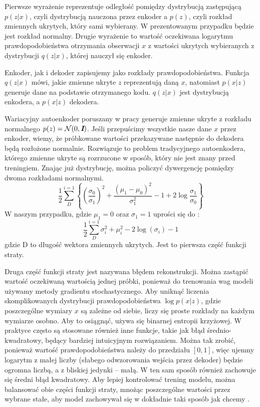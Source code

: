 \documentclass[a4paper,12pt,oneside]{book} %
\begin{document}
Pierwsze wyrażenie reprezentuje odległość pomiędzy dystrybucją zastępującą $p(z|x)$, czyli dystrybucją nauczona przez enkoder a $p(z)$, czyli rozkład zmiennych ukrytych, który sami wybierany. W prezentowanym przypadku będzie jest rozkład normalny. Drugie wyrażenie to wartość oczekiwana logarytmu prawdopodobieństwa otrzymania obserwacji $x$ z wartości ukrytych wybieranych z dystrybucji $q(z|x)$, której nauczył się enkoder.

Enkoder, jak i dekoder zapisujemy jako rozkłady prawdopodobieństwa. Funkcja $q(z|x)$ mówi, jakie zmienne ukryte $z$ reprezentują daną $x$, natomiast $p(x|z)$ generuje dane na podstawie otrzymanego kodu. $q(z|x)$ jest dystrybucją enkodera, a $p(x|z)$ dekodera.

Wariacyjny autoenkoder poruszany w pracy generuje zmienne ukryte z rozkładu normalnego $p(z)=\mathcal{N}(0,\textit{\textbf{I}})$. Jeśli przepuścimy wszystkie nasze dane $x$ przez enkoder, wiemy, że próbkowane wartości przekazywane następnie do dekodera będą rozłożone normalnie. Rozwiązuje to problem tradycyjnego autoenkodera, którego zmienne ukryte są rozrzucone w sposób, który nie jest znany przed treningiem. Znając już dystrybucję, można policzyć dywergencję pomiędzy dwoma rozkładami normalnymi.
\begin{equation}
	\dfrac{1}{2}\displaystyle\sum_{D}^{i=1}\left\{\left(\dfrac{\sigma_0}{\sigma_1}\right)^2+\dfrac{(\mu_1 - \mu_0)^2}{\sigma_1^2} - 1 + 2\log\dfrac{\sigma_1}{\sigma_0}\right\}
	\label{equ:kldnormals}
\end{equation}
W naszym przypadku, gdzie $\mu_1 = 0$ oraz $\sigma_1=1$ uprości się do \cite{kingma2014autoencoding}:
\begin{equation}
	\dfrac{1}{2}\displaystyle\sum_{D}^{i=1}\sigma_i^2+\mu_i^2-2\log(\sigma_i)-1
	\label{equ:kld_loss}
\end{equation} 
gdzie D to długość wektora zmiennych ukrytych. Jest to pierwsza część funkcji straty. 

Druga część funkcji straty jest nazywana błędem rekonstrukcji. Można zastąpić wartość oczekiwaną wartością jednej próbki, ponieważ do trenowania wag modeli używamy metody gradientu stochastycznego. Aby uniknąć liczenia skomplikowanych dystrybucji prawdopodobieństwa $\log p(x|z)$, gdzie poszczególne wymiary $x$ są zależne od siebie, liczy się proste rozkłady na każdym wymiarze osobno. Aby to osiągnąć, używa się binarnej entropii krzyżowej. W praktyce często są stosowane również inne funkcje, takie jak błąd średnio-kwadratowy, będący bardziej intuicyjnym rozwiązaniem.
Można tak zrobić, ponieważ wartość prawdopodobieństwa należy do przedziału $\left[ 0, 1\right] $, więc ujemny logarytm z małej liczby (słabego odwzorowania wejścia przez dekoder) będzie ogromna liczbą, a z bliskiej jedynki -- małą. W ten sam sposób również zachowuje się średni błąd kwadratowy. Aby lepiej kontrolować trening modelu, można balansować obie części funkcji straty, mnożąc poszczególne wartości przez wybrane stałe, aby model zachowywał się w dokładnie taki sposób jak chcemy \cite{balancing}.
\end{document}
